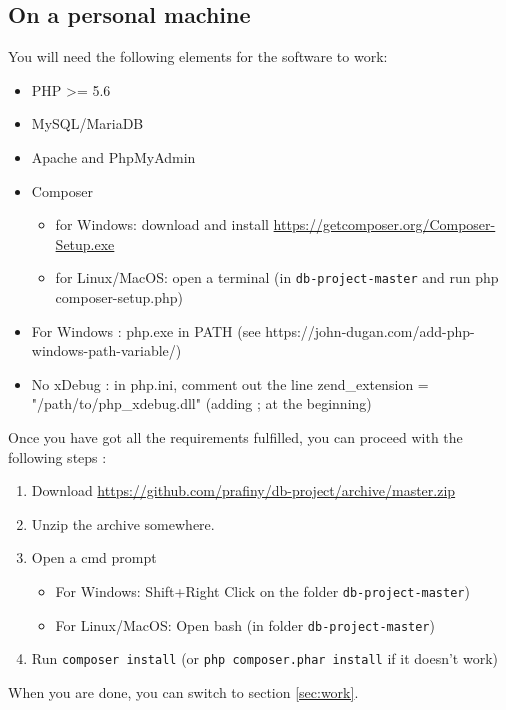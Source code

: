 \documentclass[twoside,a4paper,12pt]{article}
\begin{document}
\subsection{On a personal machine}
You will need the following elements for the software to work:
\begin{itemize}
\item PHP >= 5.6
\item MySQL/MariaDB
\item Apache and PhpMyAdmin
\item Composer 
	\begin{itemize}
		\item for Windows: download and install \url{https://getcomposer.org/Composer-Setup.exe}
		\item for Linux/MacOS: open a terminal (in \texttt{db-project-master} and run php composer-setup.php)
	\end{itemize}
\item For Windows : php.exe in PATH (see https://john-dugan.com/add-php-windows-path-variable/)
\item No xDebug : in php.ini, comment out the line zend\_extension = "/path/to/php\_xdebug.dll" (adding ; at the beginning)
\end{itemize}

Once you have got all the requirements fulfilled, you can proceed with the following steps :

\begin{enumerate}
\item Download \url{https://github.com/prafiny/db-project/archive/master.zip}
\item Unzip the archive somewhere.
\item Open a cmd prompt
\begin{itemize}
	\item For Windows: Shift+Right Click on the folder \texttt{db-project-master})
	\item For Linux/MacOS: Open bash (in folder \texttt{db-project-master})
\end{itemize}
\item Run \texttt{composer install} (or \texttt{php composer.phar install} if it doesn't work)
\end{enumerate}

When you are done, you can switch to section \ref{sec:work}.
\end{document}
